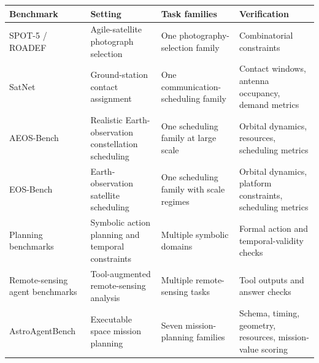 \documentclass[]{mosi}
\begin{document}
\begin{center}
\small
\setlength{\tabcolsep}{3.4pt}
\renewcommand{\arraystretch}{1.08}
\begin{tabular}{>{\raggedright\arraybackslash}p{}>{\raggedright\arraybackslash}p{}>{\raggedright\arraybackslash}p{}>{\raggedright\arraybackslash}p{}}
\hline
\rowcolor{headerrow}
\textbf{Benchmark} & \textbf{Setting} & \textbf{Task families} & \textbf{Verification} \\
\hline
\rowcolor{solverrow}
SPOT-5 / ROADEF \citep{lemaitrea2002selecting} & Agile-satellite photograph selection & One photography-selection family & Combinatorial constraints \\
\rowcolor{solverrow}
SatNet \citep{goh2022satnet} & Ground-station contact assignment & One communication-scheduling family & Contact windows, antenna occupancy, demand metrics \\
\rowcolor{solverrow}
AEOS-Bench \citep{wang2026towards} & Realistic Earth-observation constellation scheduling & One scheduling family at large scale & Orbital dynamics, resources, scheduling metrics \\
\rowcolor{solverrow}
EOS-Bench \citep{yin2026eosbench} & Earth-observation satellite scheduling & One scheduling family with scale regimes & Orbital dynamics, platform constraints, scheduling metrics \\
\hline
\rowcolor{agentrow}
Planning benchmarks \citep{valmeekam2023planning,valmeekam2023planbench,ding2025tcp} & Symbolic action planning and temporal constraints & Multiple symbolic domains & Formal action and temporal-validity checks \\
\rowcolor{agentrow}
Remote-sensing agent benchmarks \citep{shabbir2025thinkgeo} & Tool-augmented remote-sensing analysis & Multiple remote-sensing tasks & Tool outputs and answer checks \\
\rowcolor{agentrow}
AstroAgentBench & Executable space mission planning & Seven mission-planning families & Schema, timing, geometry, resources, mission-value scoring \\
\hline
\end{tabular}
\label{tab:benchmark-landscape}
\end{center}
\vspace{0.75\baselineskip}
\end{document}
